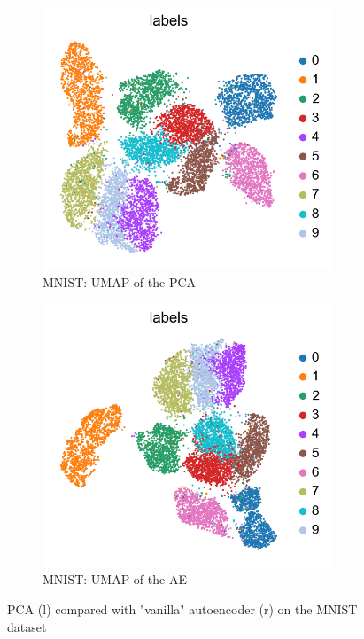 \documentclass[11pt, a4paper]{report}
\theoremstyle{plain}
\theoremstyle{definition}
\theoremstyle{remark}
\begin{document}
\begin{figure}[h]
\centering
\begin{subfigure}[t]{0.45\textwidth}
\includegraphics[width=0.95\textwidth]{images/pca.umap.mnist.png}
\caption{MNIST: UMAP of the PCA}
\end{subfigure}
\begin{subfigure}[t]{0.45\textwidth}
\includegraphics[width=0.95\textwidth]{images/ae.umap.mnist.png}
\caption{MNIST: UMAP of the AE}
\end{subfigure}
\caption{PCA (l) compared with "vanilla" autoencoder (r) on the MNIST dataset}
\label{fig:pcavae}
\end{figure}
\end{document}
